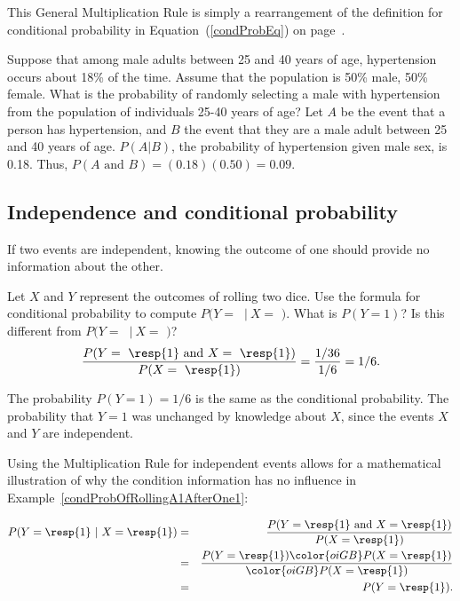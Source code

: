 This General Multiplication Rule is simply a rearrangement of the definition for conditional probability in Equation~(\ref{condProbEq}) on page~\pageref{condProbEq}.

\begin{examplewrap}
\begin{nexample}{Suppose that among male adults between 25 and 40 years of age, hypertension occurs about 18\% of the time. Assume that the population is 50\% male, 50\% female. What is the probability of randomly selecting a male with hypertension from the population of individuals 25-40 years of age?} 
Let $A$ be the event that a person has hypertension, and $B$ the event that they are a male adult between 25 and 40 years of age. $P(A|B)$, the probability of hypertension given male sex, is 0.18. Thus, $P(A \text{ and } B) = (0.18)(0.50) = 0.09$.
\end{nexample}
\end{examplewrap}


\subsection{Independence and conditional probability}

If two events are independent, knowing the outcome of one should provide no information about the other.

\begin{examplewrap}
\begin{nexample}{Let $X$ and $Y$ represent the outcomes of rolling two dice. Use the formula for conditional probability to compute $P(Y =$ $\ |\ X = $ $)$. What is $P(Y=1)$? Is this different from $P(Y =$ $\ |\ X = $ $)$?}\label{condProbOfRollingA1AfterOne1}%
\[\frac{P(Y = \text{ \resp{1} and }X=\text{ \resp{1}})}{P(X=\text{ \resp{1}})} = \frac{1/36}{1/6} = 1/6.\]

The probability $P(Y=1) = 1/6$ is the same as the conditional probability. The probability that $Y=1$ was unchanged by knowledge about $X$, since the events $X$ and $Y$ are independent.
\end{nexample}
\end{examplewrap}

\textD{\newpage}

Using the Multiplication Rule for independent events allows for a mathematical illustration of why the condition information has no influence in Example~\ref{condProbOfRollingA1AfterOne1}:

\begin{eqnarray*}
P(Y=\text{\resp{1}}\ |\ X=\text{\resp{1}})
	&=& \frac{P(Y=\text{\resp{1} and }X=\text{\resp{1}})}{P(X=\text{\resp{1}})} \\
	&=& \frac{P(Y=\text{\resp{1}}) \color{oiGB}P(X=\text{\resp{1}})}{\color{oiGB}P(X=\text{\resp{1}})} \\
	&=& P(Y=\text{\resp{1}}). \\
\end{eqnarray*}

